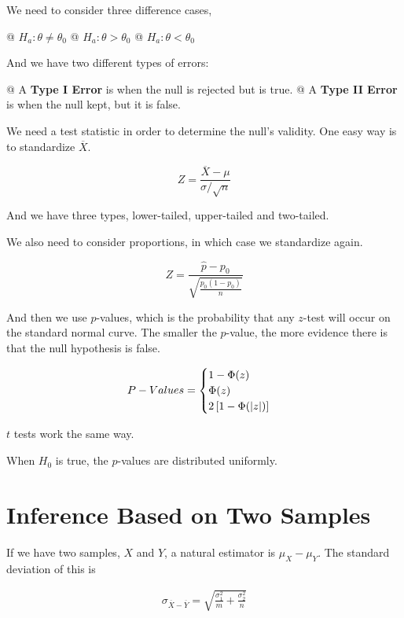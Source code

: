 We need to consider three difference cases,

\NewList
\begin{easylist}
    @ $H_a : \theta \neq \theta_0$
    @ $H_a : \theta > \theta_0$
    @ $H_a : \theta < \theta_0$
\end{easylist}

And we have two different types of errors:

\NewList
\begin{easylist}
    @ A \textbf{Type I Error} is when the null is rejected but is true.
    @ A \textbf{Type II Error} is when the null kept, but it is false.
\end{easylist}

We need a test statistic in order to determine the null's validity. One easy way is to standardize $\overline{X}$.

\[
    Z = \frac{\overline{X} - \mu}{\sigma / \sqrt{n} }
\]

And we have three types, lower-tailed, upper-tailed and two-tailed.

We also need to consider proportions, in which case we standardize again.

\[
    Z = \frac{\hat{p} - p_0}{\sqrt{\frac{p_0 (1 - p_0)}{n} } }
\]

And then we use $p$-values, which is the probability that any $z$-test will occur on the standard normal curve. The
smaller the $p$-value, the more evidence there is that the null hypothesis is false.

\[
    P-Values =
    \begin{cases}
        1 - \Phi(z)\\
        \Phi(z)\\
        2 \left[ 1 - \Phi(\left\lvert z \right\rvert) \right]
    \end{cases}
\]

$t$ tests work the same way.

When $H_0$ is true, the $p$-values are distributed uniformly.

\section{Inference Based on Two Samples}
If we have two samples, $X$ and $Y$, a natural estimator is $\mu_X - \mu_Y$. The standard deviation of this is

\begin{equation*}
    \begin{aligned}
        \sigma_{\overline{X} - \overline{Y} } = \sqrt{\frac{\sigma_1^2}{m} + \frac{\sigma_2^2}{n} }
    \end{aligned}
\end{equation*}

